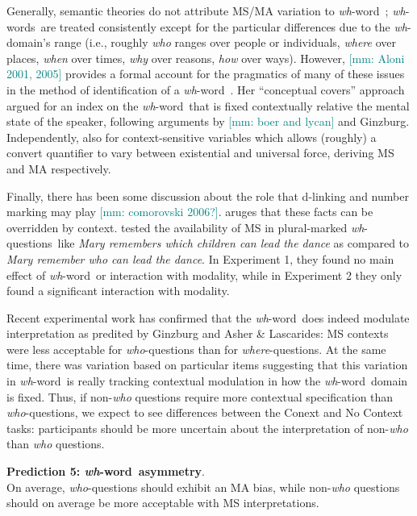\documentclass[12pt,letterpaper,table,svgnames,dvipsnames]{article}
\newcommand{\mm}[1]{\textcolor{teal}{[mm: #1]}}
\newcommand{\whqs}{\emph{wh}-questions~}
\newcommand{\whw}{\emph{wh}-word~}
\newcommand{\whws}{\emph{wh}-words~}
\begin{document}
Generally, semantic theories do not attribute MS/MA variation to \whw$\!$; \whws are treated consistently except for the particular differences due to the \emph{wh}-domain's range (i.e., roughly \emph{who} ranges over people or individuals, \emph{where} over places, \emph{when} over times, \emph{why} over reasons, \emph{how} over ways). However, \mm{Aloni 2001, 2005} provides a formal account for the pragmatics of many of these issues in the method of identification of a \whw. Her ``conceptual covers'' approach argued for an index on the \whw that is fixed contextually relative the mental state of the speaker, following arguments by \mm{boer and lycan} and Ginzburg. Independently,  also for context-sensitive variables which allows (roughly) a convert quantifier to vary between existential and universal force, deriving MS and MA respectively. 

Finally, there has been some discussion about the role that d-linking and number marking may play \cite{pesetsky1987,srivastav1991,dayal1996,comorovski1996,xiang2016}\mm{comorovski 2006?}.  aruges that these facts can be overridden by context.  tested the availability of MS in plural-marked \whqs like \emph{Mary remembers which children can lead the dance} as compared to \emph{Mary remember who can lead the dance}. In Experiment 1, they found no main effect of \whw or interaction with modality, while in Experiment 2 they only found a significant interaction with modality. 


Recent experimental work \cite{moyer2020,moyersyrett2019} has confirmed that the \whw does indeed modulate interpretation as predited by Ginzburg and Asher \& Lascarides: MS contexts were less acceptable for \emph{who}-questions than for \emph{where}-questions. At the same time, there was variation based on particular items suggesting that this variation in \whw is really tracking contextual modulation in how the \whw domain is fixed. Thus, if non-\emph{who} questions require more contextual specification than \emph{who}-questions, we expect to see differences between the Conext and No Context tasks: participants should be more uncertain about the interpretation of non-\emph{who} than \emph{who} questions.

\begin{tcolorbox}[colback=white]
\noindent \textbf{Prediction 5: \whw asymmetry}.\\
On average, \emph{who}-questions should exhibit an MA bias, while non-\emph{who} questions should on average be more acceptable with MS interpretations. 
\end{tcolorbox}
\end{document}
